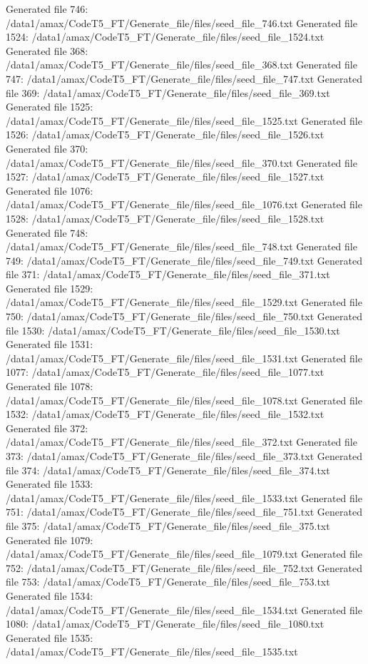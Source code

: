 Generated file 746: /data1/amax/CodeT5_FT/Generate_file/files/seed_file_746.txt
Generated file 1524: /data1/amax/CodeT5_FT/Generate_file/files/seed_file_1524.txt
Generated file 368: /data1/amax/CodeT5_FT/Generate_file/files/seed_file_368.txt
Generated file 747: /data1/amax/CodeT5_FT/Generate_file/files/seed_file_747.txt
Generated file 369: /data1/amax/CodeT5_FT/Generate_file/files/seed_file_369.txt
Generated file 1525: /data1/amax/CodeT5_FT/Generate_file/files/seed_file_1525.txt
Generated file 1526: /data1/amax/CodeT5_FT/Generate_file/files/seed_file_1526.txt
Generated file 370: /data1/amax/CodeT5_FT/Generate_file/files/seed_file_370.txt
Generated file 1527: /data1/amax/CodeT5_FT/Generate_file/files/seed_file_1527.txt
Generated file 1076: /data1/amax/CodeT5_FT/Generate_file/files/seed_file_1076.txt
Generated file 1528: /data1/amax/CodeT5_FT/Generate_file/files/seed_file_1528.txt
Generated file 748: /data1/amax/CodeT5_FT/Generate_file/files/seed_file_748.txt
Generated file 749: /data1/amax/CodeT5_FT/Generate_file/files/seed_file_749.txt
Generated file 371: /data1/amax/CodeT5_FT/Generate_file/files/seed_file_371.txt
Generated file 1529: /data1/amax/CodeT5_FT/Generate_file/files/seed_file_1529.txt
Generated file 750: /data1/amax/CodeT5_FT/Generate_file/files/seed_file_750.txt
Generated file 1530: /data1/amax/CodeT5_FT/Generate_file/files/seed_file_1530.txt
Generated file 1531: /data1/amax/CodeT5_FT/Generate_file/files/seed_file_1531.txt
Generated file 1077: /data1/amax/CodeT5_FT/Generate_file/files/seed_file_1077.txt
Generated file 1078: /data1/amax/CodeT5_FT/Generate_file/files/seed_file_1078.txt
Generated file 1532: /data1/amax/CodeT5_FT/Generate_file/files/seed_file_1532.txt
Generated file 372: /data1/amax/CodeT5_FT/Generate_file/files/seed_file_372.txt
Generated file 373: /data1/amax/CodeT5_FT/Generate_file/files/seed_file_373.txt
Generated file 374: /data1/amax/CodeT5_FT/Generate_file/files/seed_file_374.txt
Generated file 1533: /data1/amax/CodeT5_FT/Generate_file/files/seed_file_1533.txt
Generated file 751: /data1/amax/CodeT5_FT/Generate_file/files/seed_file_751.txt
Generated file 375: /data1/amax/CodeT5_FT/Generate_file/files/seed_file_375.txt
Generated file 1079: /data1/amax/CodeT5_FT/Generate_file/files/seed_file_1079.txt
Generated file 752: /data1/amax/CodeT5_FT/Generate_file/files/seed_file_752.txt
Generated file 753: /data1/amax/CodeT5_FT/Generate_file/files/seed_file_753.txt
Generated file 1534: /data1/amax/CodeT5_FT/Generate_file/files/seed_file_1534.txt
Generated file 1080: /data1/amax/CodeT5_FT/Generate_file/files/seed_file_1080.txt
Generated file 1535: /data1/amax/CodeT5_FT/Generate_file/files/seed_file_1535.txt
